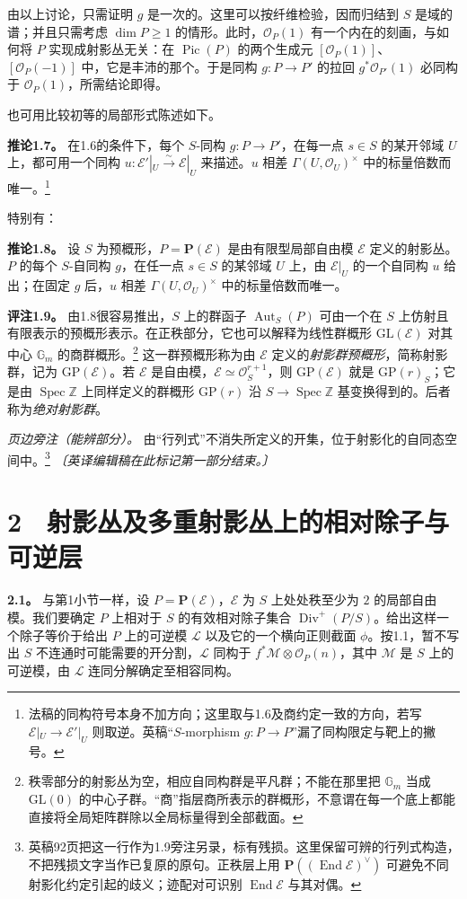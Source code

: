 \documentclass[openany,fontset=fandol]{ctexbook}
\newcommand{\OO}{\mathcal O}
\newcommand{\LL}{\mathcal L}
\newcommand{\MM}{\mathcal M}
\newcommand{\EE}{\mathcal E}
\DeclareMathOperator{\Pic}{Pic}
\DeclareMathOperator{\Spec}{Spec}
\DeclareMathOperator{\Aut}{Aut}
\DeclareMathOperator{\End}{End}
\DeclareMathOperator{\Div}{Div}
\begin{document}
由以上讨论，只需证明 \(g\) 是一次的。这里可以按纤维检验，因而归结到 \(S\) 是域的谱；并且只需考虑 \(\dim P\ge1\) 的情形。此时，\(\OO_P(1)\) 有一个内在的刻画，与如何将 \(P\) 实现成射影丛无关：在 \(\Pic(P)\) 的两个生成元 \([\OO_P(1)]\)、\([\OO_P(-1)]\) 中，它是丰沛的那个。于是同构 \(g:P\to P'\) 的拉回 \(g^*\OO_{P'}(1)\) 必同构于 \(\OO_P(1)\)，所需结论即得。

也可用比较初等的局部形式陈述如下。

\medskip\noindent\textbf{推论1.7。}
在1.6的条件下，每个 \(S\)-同构 \(g:P\to P'\)，在每一点 \(s\in S\) 的某开邻域 \(U\) 上，都可用一个同构
\(u:\EE'|_U\xrightarrow{\sim}\EE|_U\) 来描述。\(u\) 相差 \(\Gamma(U,\OO_U)^\times\) 中的标量倍数而唯一。\footnote{法稿的同构符号本身不加方向；这里取与1.6及商约定一致的方向，若写 \(\EE|_U\to\EE'|_U\) 则取逆。英稿“\(S\)-morphism \(g:P\to P\)”漏了同构限定与靶上的撇号。}

特别有：

\medskip\noindent\textbf{推论1.8。}
设 \(S\) 为预概形，\(P=\mathbf P(\EE)\) 是由有限型局部自由模 \(\EE\) 定义的射影丛。\(P\) 的每个 \(S\)-自同构 \(g\)，在任一点 \(s\in S\) 的某邻域 \(U\) 上，由 \(\EE|_U\) 的一个自同构 \(u\) 给出；在固定 \(g\) 后，\(u\) 相差 \(\Gamma(U,\OO_U)^\times\) 中的标量倍数而唯一。

\medskip\noindent\textbf{评注1.9。}
由1.8很容易推出，\(S\) 上的群函子 \(\Aut_S(P)\) 可由一个在 \(S\) 上仿射且有限表示的预概形表示。在正秩部分，它也可以解释为线性群概形 \(\mathrm{GL}(\EE)\) 对其中心 \(\mathbb G_m\) 的商群概形。\footnote{秩零部分的射影丛为空，相应自同构群是平凡群；不能在那里把 \(\mathbb G_m\) 当成 \(\mathrm{GL}(0)\) 的中心子群。“商”指层商所表示的群概形，不意谓在每一个底上都能直接将全局矩阵群除以全局标量得到全部截面。}
这一群预概形称为由 \(\EE\) 定义的\emph{射影群预概形}，简称射影群，记为 \(\mathrm{GP}(\EE)\)。若 \(\EE\) 是自由模，\(\EE\simeq\OO_S^{r+1}\)，则 \(\mathrm{GP}(\EE)\) 就是 \(\mathrm{GP}(r)_S\)；它是由 \(\Spec\mathbb Z\) 上同样定义的群概形 \(\mathrm{GP}(r)\) 沿 \(S\to\Spec\mathbb Z\) 基变换得到的。后者称为\emph{绝对射影群}。

\emph{页边旁注（能辨部分）。}
由“行列式”不消失所定义的开集，位于射影化的自同态空间中。\footnote{英稿92页把这一行作为1.9旁注另录，标有残损。这里保留可辨的行列式构造，不把残损文字当作已复原的原句。正秩层上用 \(\mathbf P((\End\EE)^\vee)\) 可避免不同射影化约定引起的歧义；迹配对可识别 \(\End\EE\) 与其对偶。}
\emph{〔英译编辑稿在此标记第一部分结束。〕}

\section*{2　射影丛及多重射影丛上的相对除子与可逆层}
\noindent\textbf{2.1。}
与第1小节一样，设 \(P=\mathbf P(\EE)\)，\(\EE\) 为 \(S\) 上处处秩至少为 \(2\) 的局部自由模。我们要确定 \(P\) 上相对于 \(S\) 的有效相对除子集合 \(\Div^+(P/S)\)。给出这样一个除子等价于给出 \(P\) 上的可逆模 \(\LL\) 以及它的一个横向正则截面 \(\phi\)。按1.1，暂不写出 \(S\) 不连通时可能需要的开分割，\(\LL\) 同构于 \(f^*\MM\otimes\OO_P(n)\)，其中 \(\MM\) 是 \(S\) 上的可逆模，由 \(\LL\) 连同分解确定至相容同构。
\end{document}
